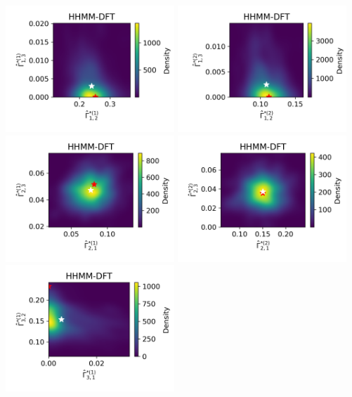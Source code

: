 \documentclass{article}
\begin{document}
\begin{center}
        \includegraphics[width=2.5in]{../Plots/hhmm_FV_uncorr_Gamma_density_0_row_0.png}
        \includegraphics[width=2.5in]{../Plots/hhmm_FV_uncorr_Gamma_density_1_row_0.png}
        \includegraphics[width=2.5in]{../Plots/hhmm_FV_uncorr_Gamma_density_0_row_1.png}
        \includegraphics[width=2.5in]{../Plots/hhmm_FV_uncorr_Gamma_density_1_row_1.png}
        \includegraphics[width=2.5in]{../Plots/hhmm_FV_uncorr_Gamma_density_0_row_2.png}

\end{center}
\end{document}

